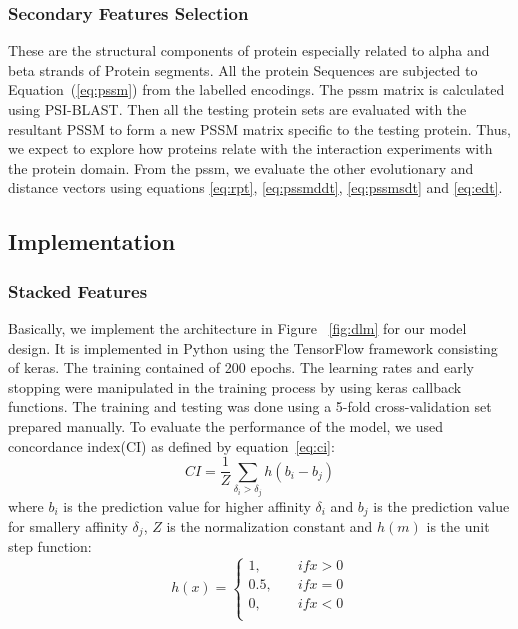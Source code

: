 \subsubsection{Secondary Features Selection}
These are the structural components of protein especially related to alpha and beta strands of Protein segments. All the protein Sequences are subjected to Equation~(\ref{eq:pssm}) from the labelled encodings. The \acrshort{pssm} matrix is calculated using PSI-BLAST\cite{Schaffer2001}. Then all the testing protein sets are evaluated with the resultant PSSM to form a new PSSM matrix specific to the testing protein. Thus, we expect to explore how proteins relate with the interaction experiments with the protein domain. From the \acrshort{pssm}, we evaluate the other evolutionary and distance vectors using equations \ref{eq:rpt}, \ref{eq:pssmddt}, \ref{eq:pssmsdt} and \ref{eq:edt}.

\subsection{Implementation}


\subsubsection{Stacked Features}
Basically, we implement the architecture in Figure ~\ref{fig:dlm} for our model design. It is implemented in Python using the TensorFlow framework consisting of keras. The training contained of 200 epochs. The learning rates and early stopping were manipulated in the training process by using keras callback functions. The training and testing was done using a 5-fold cross-validation set prepared manually. To evaluate the performance of the model, we used concordance index(CI)\cite{Xu2015} as defined by equation~\ref{eq:ci}:
\begin{equation}
    CI = \frac{1}{Z} \sum_{\delta_i > \delta_j} h(b_i - b_j)
    \label{eq:ci}
\end{equation}
where $b_i$ is the prediction value for higher affinity $\delta_i$ and $b_j$ is the prediction value for smallery affinity $\delta_j$, $Z$ is the normalization constant and $h(m)$ is the unit step function:
\begin{equation} h(x) = 
    \begin{cases}
        1,& \quad {if x>0} \\
        0.5, & \quad{ if x=0 } \\
        0, & \quad{if x<0} \\
    \end{cases}
\end{equation}

